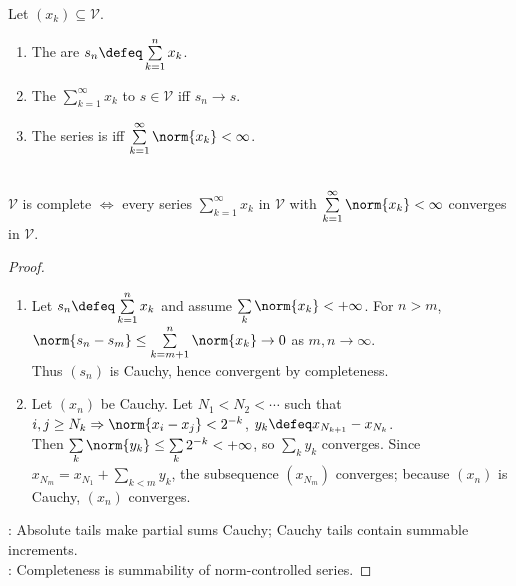 \begin{definition} \label{def:hilbert-vector-series} \\
Let $(x_k)\subseteq\mathcal{V}$.
\begin{enumerate}[label=(\roman*)]
\setlength{\itemsep}{0pt}
\item The  are $s_n\defeq\sum\limits_{k=1}^{n}x_k$.
\item The  $\sum\limits_{k=1}^{\infty}x_k$  to $s\in\mathcal{V}$ iff $s_n\to s$.
\item The series is  iff $\sum\limits_{k=1}^{\infty}\norm{x_k}<\infty$.
\end{enumerate}
\end{definition}

\begin{theorem} \label{thm:hilbert-completeness-absolute-series} \\
$\mathcal{V}$ is complete $\Longleftrightarrow$ every series $\sum\limits_{k=1}^{\infty}x_k$ in $\mathcal{V}$ with $\sum\limits_{k=1}^{\infty}\norm{x_k}<\infty$ converges in $\mathcal{V}$.
\begin{proof}
\begin{enumerate}[label=\roman*.]
\setlength{\itemsep}{0pt}
\item[$(\Rightarrow)$] Let $s_n\defeq\sum\limits_{k=1}^{n}x_k$ and assume $\sum\limits_k\norm{x_k}<+\infty$. For $n>m$, $\norm{s_n-s_m}\leq\sum\limits_{k=m+1}^{n}\norm{x_k}\to0$ as $m,n\to\infty$.\\
Thus $(s_n)$ is Cauchy, hence convergent by completeness.
\item[$(\Leftarrow)$] Let $(x_n)$ be Cauchy. Let $N_1<N_2<\cdots$ such that $i,j\geq N_k\Rightarrow\norm{x_i-x_j}<2^{-k}$, $y_k\defeq x_{N_{k+1}}-x_{N_k}$.\\
Then $\sum\limits_k\norm{y_k}\leq\sum\limits_k2^{-k}<+\infty$, so $\sum\limits_ky_k$ converges. Since $x_{N_m}=x_{N_1}+\sum\limits_{k<m}y_k$, the subsequence $(x_{N_m})$ converges; because $(x_n)$ is Cauchy, $(x_n)$ converges.
\end{enumerate}
: Absolute tails make partial sums Cauchy; Cauchy tails contain summable increments.\\
: Completeness is summability of norm-controlled series.
\end{proof}
\end{theorem}

